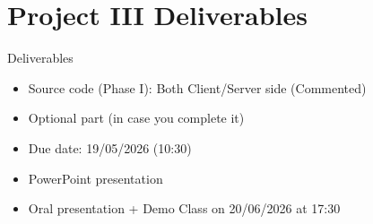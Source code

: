 \section{Project III Deliverables}
\begin{frame}{Deliverables}
    \begin{itemize}
        \item Source code (Phase I): Both Client/Server side (Commented)
        \item Optional part (in case you complete it)
        \item Due date: 19/05/2026 (10:30)
        \item PowerPoint presentation 
        \item Oral presentation + Demo Class on 20/06/2026 at 17:30
    \end{itemize}
\end{frame}
